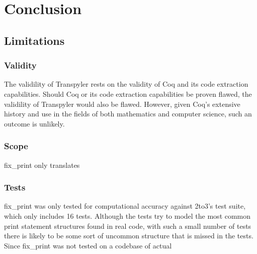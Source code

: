 \section{Conclusion}
\subsection{Limitations}
\subsubsection{Validity}
The validility of Transpyler rests on the validity of Coq and its code extraction capabilities. Should Coq or its code extraction capabilities be proven flawed, the validility of Transpyler would also be flawed. However, given Coq's extensive history and use in the fields of both mathematics and computer science, such an outcome is unlikely.
\subsubsection{Scope}
fix\_print only translates 
\subsubsection{Tests}
fix\_print was only tested for computational accuracy against 2to3's test suite, which only includes 16 tests. Although the tests try to model the most common print statement structures found in real code, with such a small number of tests there is likely to be some sort of uncommon structure that is missed in the tests. Since fix\_print was not tested on a codebase of actual 